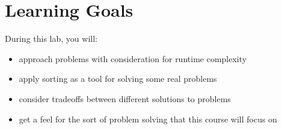 


\section*{Learning Goals}
During this lab, you will:
\begin{itemize}
    \item approach problems with consideration for runtime complexity
    \item apply sorting as a tool for solving some real problems
    \item consider tradeoffs between different solutions to problems
    \item get a feel for the sort of problem solving that this course will focus on
\end{itemize}
